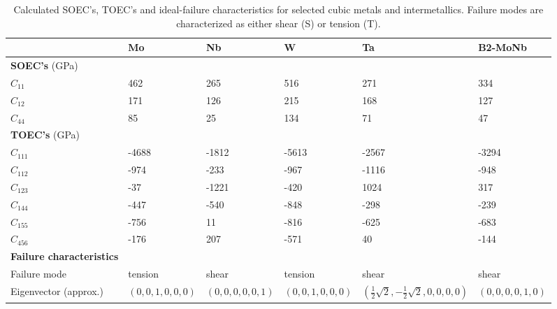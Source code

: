 \documentclass[showpacs,aps,floatfix,prb,reprint,superscriptaddress]{revtex4-1}
\begin{document}
\begin{table*}
\caption{\label{tab:cubic_properties_total} Calculated SOEC's, TOEC's and ideal-failure characteristics for selected cubic metals and intermetallics. Failure modes are characterized as either shear (S) or tension (T).}
\begin{ruledtabular}
\begin{tabular}{l l l l l l}
 & Mo & Nb & W & Ta & B2-MoNb \\
\hline
\textbf{SOEC's} (GPa) & & & & &  \\
$C_{11}$ & 462 & 265 & 516 & 271 & 334  \\
$C_{12}$ & 171 & 126 & 215 & 168 & 127  \\
$C_{44}$ & 85  & 25  & 134 & 71 & 47  \\
\hline
\textbf{TOEC's} (GPa) & & & & &   \\
$C_{111}$ & -4688 & -1812 & -5613 & -2567 & -3294 \\
$C_{112}$ & -974  & -233  & -967 & -1116 & -948 \\
$C_{123}$ & -37   & -1221 & -420 & 1024 & 317 \\
$C_{144}$ & -447  & -540  & -848 & -298 & -239 \\
$C_{155}$ & -756  & 11    & -816 & -625 & -683 \\
$C_{456}$ & -176  & 207   & -571 & 40 & -144 \\
\hline
\textbf{Failure characteristics} & & & & & \\
Failure mode & tension & shear & tension & shear & shear \\
Eigenvector (approx.)  & $\left(0,0,1,0,0,0\right)$ & $\left(0,0,0,0,0,1\right)$ & $\left(0,0,1,0,0,0\right)$ & $\left(\frac{1}{2}\sqrt{2},-\frac{1}{2}\sqrt{2},0,0,0,0\right)$ & $\left(0,0,0,0,1,0\right)$ \\
\end{tabular}
\end{ruledtabular}
\end{table*}
\end{document}
